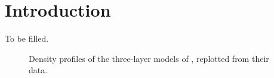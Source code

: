 
\section{Introduction}\label{sec:intro}
To be filled.

\begin{figure}[tb!]
\centering
{}
\caption{Density profiles of the three-layer models of \citet{Nettelmann2013a},
replotted from their data.}
\label{fig:N13_profs}
\end{figure}
